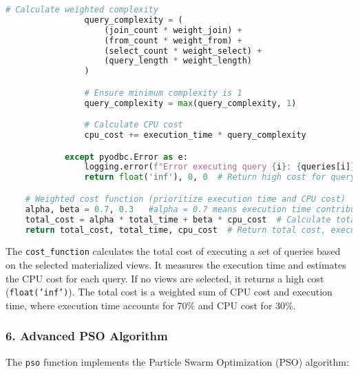 \begin{lstlisting}[language=Python]
                # Calculate weighted complexity
                query_complexity = (
                    (join_count * weight_join) +
                    (from_count * weight_from) +
                    (select_count * weight_select) +
                    (query_length * weight_length)
                )

                # Ensure minimum complexity is 1
                query_complexity = max(query_complexity, 1)

                # Calculate CPU cost
                cpu_cost += execution_time * query_complexity

            except pyodbc.Error as e:
                logging.error(f"Error executing query {i}: {queries[i]}", exc_info=True)  # Log query execution error
                return float('inf'), 0, 0  # Return high cost for query errors

    # Weighted cost function (prioritize execution time and CPU cost)
    alpha, beta = 0.7, 0.3   #alpha = 0.7 means execution time contributes 70% to the total cost.beta = 0.3 means CPU cost contributes 30% to the total cost.
    total_cost = alpha * total_time + beta * cpu_cost  # Calculate total cost
    return total_cost, total_time, cpu_cost  # Return total cost, execution time, and CPU cost
\end{lstlisting}\vspace{.4cm}

The \texttt{cost\_function} calculates the total cost of executing a set of queries based on the selected materialized views. It measures the execution time and estimates the CPU cost for each query. If no views are selected, it returns a high cost (\texttt{float('inf')}). The total cost is a weighted sum of CPU cost and execution time, where execution time accounts for 70\% and CPU cost for 30\%.

\subsubsection*{6. Advanced PSO Algorithm}
The \texttt{pso} function implements the Particle Swarm Optimization (PSO) algorithm:

